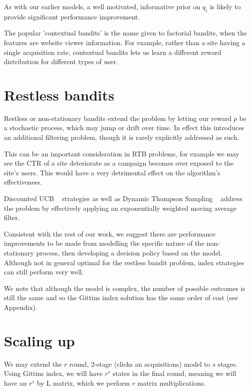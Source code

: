 \documentclass[11pt,a4,singlespacing,titlepagenumber=on]{scrreprt}
\numberwithin{equation}{chapter} %
\theoremstyle{remark}
\begin{document}
As with our earlier models, a well motivated, informative prior on $q_i$ is likely to provide significant performance improvement.

The popular 'contextual bandits' is the name given to factorial bandits, when the features are website viewer information. For example, rather than a site having a single acquisition rate, contextual bandits lets us learn a different reward distribution for different types of user.

\section{Restless bandits}

Restless or non-stationary bandits extend the problem by letting our reward $p$ be a stochastic process, which may jump or drift over time. In effect this introduces an additional filtering problem, though it is rarely explicitly addressed as such.

This can be an important consideration in RTB problems, for example we may see the CTR of a site deteriorate as a campaign becomes over exposed to the site's users. This would have a very detrimental effect on the algorithm's effectiveness.

Discounted UCB ~\cite{garivier2008upper} strategies as well as Dynamic Thompson Sampling ~\cite{gupta2011thompson} address the problem by effectively applying an exponentially weighted moving average filter. 

Consistent with the rest of our work, we suggest there are performance improvements to be made from modelling the specific nature of the non-stationary process, then developing a decision policy based on the model. Although not in general optimal for the restless bandit problem, index strategies can still perform very well. 

We note that although the model is complex, the number of possible outcomes is still the same and so the Gittins index solution has the same order of cost (see Appendix).

\section{Scaling up}

We may extend the $r$ round, 2-stage (clicks an acquisitions) model to $s$ stages. Using Gittins index, we will have $r^s$ states in the final round, meaning we will have an $r^s$ by L matrix, which we perform $r$ matrix multiplications.
\end{document}
